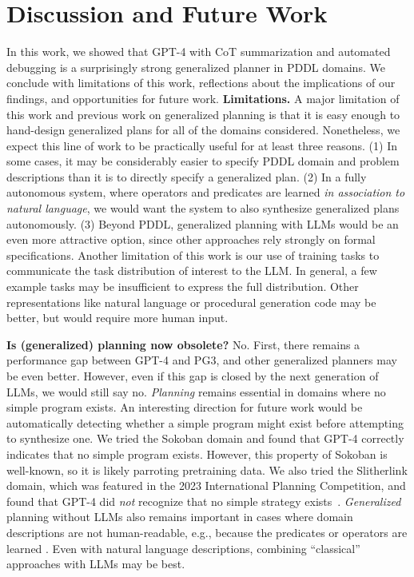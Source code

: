 \documentclass[letterpaper]{article} %
\begin{document}
\vspace{-0.75mm}
\section{Discussion and Future Work}

In this work, we showed that GPT-4 with CoT summarization and automated debugging is a surprisingly strong generalized planner in PDDL domains.
We conclude with limitations of this work, reflections about the implications of our findings, and opportunities for future work.  \textbf{Limitations.}
A major limitation of this work and previous work on generalized planning is that it is easy enough to hand-design generalized plans for all of the domains considered.
Nonetheless, we expect this line of work to be practically useful for at least three reasons.
(1) In some cases, it may be considerably easier to specify PDDL domain and problem descriptions than it is to directly specify a generalized plan.
(2) In a fully autonomous system, where operators and predicates are learned \emph{in association to natural language}, we would want the system to also synthesize generalized plans autonomously.
(3) Beyond PDDL, generalized planning with LLMs would be an even more attractive option, since other approaches rely strongly on formal specifications.
Another limitation of this work is our use of training tasks to communicate the task distribution of interest to the LLM.
In general, a few example tasks may be insufficient to express the full distribution.
Other representations like natural language or procedural generation code may be better, but would require more human input.

\textbf{Is (generalized) planning now obsolete?}
No.
First, there remains a performance gap between GPT-4 and PG3, and other generalized planners may be even better.
However, even if this gap is closed by the next generation of LLMs, we would still say no.
\emph{Planning} remains essential in domains where no simple program exists.
An interesting direction for future work would be automatically detecting whether a simple program might exist before attempting to synthesize one.
We tried the Sokoban domain and found that GPT-4 correctly indicates that no simple program exists.
However, this property of Sokoban is well-known, so it is likely parroting pretraining data.
We also tried the Slitherlink domain, which was featured in the 2023 International Planning Competition, and found that GPT-4 did \emph{not} recognize that no simple strategy exists~\cite{Yato2003OnTN}.
\emph{Generalized} planning without LLMs also remains important in cases where domain descriptions are not human-readable, e.g., because the predicates or operators are learned
\cite{silver2023inventing}.
Even with natural language descriptions, combining ``classical'' approaches with LLMs may be best.
\end{document}
